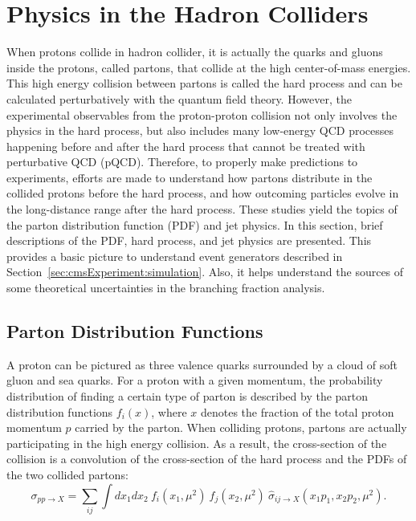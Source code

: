 

\section{Physics in the Hadron Colliders}
\label{sec:physics:ppCollision} 

When protons collide in hadron collider, it is actually the quarks and gluons inside the protons, called partons, that collide at the high center-of-mass energies. This high energy collision between partons is called the hard process and can be calculated perturbatively with the quantum field theory. However, the experimental observables from the proton-proton collision not only involves the physics in the hard process, but also includes many low-energy QCD processes happening before and after the hard process that cannot be treated with perturbative QCD (pQCD). Therefore, to properly make predictions to experiments, efforts are made to understand how partons distribute in the collided protons before the hard process, and how outcoming particles evolve in the long-distance range after the hard process. These studies yield the topics of the parton distribution function (PDF) and jet physics. In this section, brief descriptions of the PDF, hard process, and jet physics are presented. This provides a basic picture to understand event generators described in Section~\ref{sec:cmsExperiment:simulation}. Also, it helps understand the sources of some theoretical uncertainties in the \PW branching fraction analysis.

\subsection{Parton Distribution Functions}
\label{sec:physics:ppCollision:pdf} 


A proton can be pictured as three valence quarks surrounded by a cloud of soft gluon and sea quarks. For a proton with a given momentum, the probability distribution of finding a certain type of parton is described by the parton distribution functions $f_i(x)$, where $x$ denotes the fraction of the total proton momentum $p$ carried by the parton. When colliding protons, partons are actually participating in the high energy collision. As a result, the cross-section of the collision is a convolution of the cross-section of the hard process and the PDFs of the two collided partons:
\begin{equation}
    \sigma_{pp\to X } = \sum_{ij}\int dx_1 dx_2 ~ f_i(x_1, \mu^2) ~ f_j(x_2, \mu^2) ~ \hat{\sigma}_{ij\to X } (x_1 p_1, x_2 p_2,\mu^2) .
    \label{eqn:physics:qft:ppCollision:factorization}
\end{equation}


